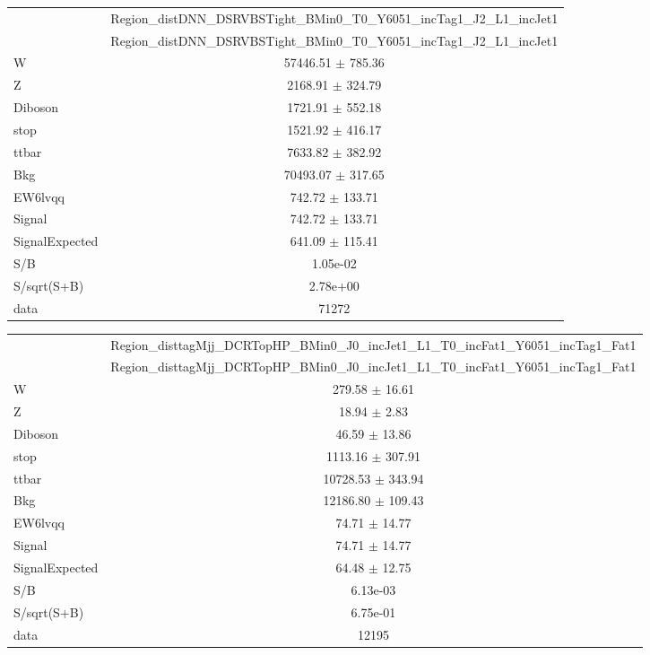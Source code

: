 \documentclass{article}
\begin{document}
\begin{table}
\centering
\small
\begin{tabular}{l|c|}
\cline{2-2}
 & \multicolumn{1}{c|}{Region\_distDNN\_DSRVBSTight\_BMin0\_T0\_Y6051\_incTag1\_J2\_L1\_incJet1}\\
\cline{2-2}
 & \multicolumn{1}{c|}{Region\_distDNN\_DSRVBSTight\_BMin0\_T0\_Y6051\_incTag1\_J2\_L1\_incJet1}\\ \hline
W & 57446.51 $\pm$ 785.36\\
Z & 2168.91 $\pm$ 324.79\\
Diboson & 1721.91 $\pm$ 552.18\\
stop & 1521.92 $\pm$ 416.17\\
ttbar & 7633.82 $\pm$ 382.92\\
\hline
Bkg & 70493.07 $\pm$ 317.65\\
\hline
EW6lvqq & 742.72 $\pm$ 133.71\\
\hline
Signal & 742.72 $\pm$ 133.71\\
SignalExpected & 641.09 $\pm$ 115.41\\
\hline
S/B & 1.05e-02\\
S/sqrt(S+B) & 2.78e+00\\
\hline
data & 71272\\ \hline
\end{tabular}
\end{table}


\begin{table}
\centering
\small
\begin{tabular}{l|c|}
\cline{2-2}
 & \multicolumn{1}{c|}{Region\_disttagMjj\_DCRTopHP\_BMin0\_J0\_incJet1\_L1\_T0\_incFat1\_Y6051\_incTag1\_Fat1}\\
\cline{2-2}
 & \multicolumn{1}{c|}{Region\_disttagMjj\_DCRTopHP\_BMin0\_J0\_incJet1\_L1\_T0\_incFat1\_Y6051\_incTag1\_Fat1}\\ \hline
W & 279.58 $\pm$ 16.61\\
Z & 18.94 $\pm$ 2.83\\
Diboson & 46.59 $\pm$ 13.86\\
stop & 1113.16 $\pm$ 307.91\\
ttbar & 10728.53 $\pm$ 343.94\\
\hline
Bkg & 12186.80 $\pm$ 109.43\\
\hline
EW6lvqq & 74.71 $\pm$ 14.77\\
\hline
Signal & 74.71 $\pm$ 14.77\\
SignalExpected & 64.48 $\pm$ 12.75\\
\hline
S/B & 6.13e-03\\
S/sqrt(S+B) & 6.75e-01\\
\hline
data & 12195\\ \hline
\end{tabular}
\end{table}
\end{document}
